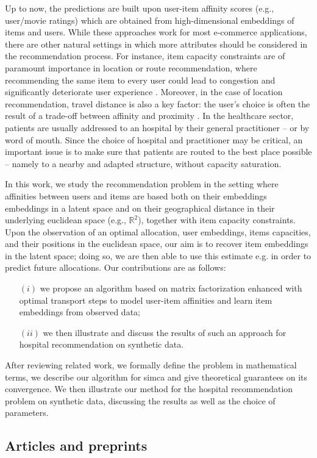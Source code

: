 Up to now, the predictions are built upon user-item affinity scores (e.g.,
user/movie ratings) which are obtained from high-dimensional embeddings of items
and users. While these approaches work for most e-commerce applications, there
are other natural settings in which more attributes should be considered in the
recommendation process. For instance, item capacity constraints are of paramount
importance in location or route recommendation, where recommending the same item
to every user could lead to congestion and significantly deteriorate  user
experience \cite{christakopoulou_recommendation_2017}. Moreover, in the case of
location recommendation, travel distance is also a key factor: the user's choice
is often the result of a trade-off between affinity and proximity
\cite{zhao_survey_2016}. In the healthcare sector, patients are usually
addressed to an hospital by their general practitioner -- or by word of mouth.
Since the choice of hospital and practitioner may be critical, an important
issue is to make sure that patients are routed to the best place possible --
namely to a nearby and adapted structure, without capacity saturation.

In this work, we study the recommendation problem in the setting where
affinities between users and items are based both on their embeddings embeddings
in a latent space and on their geographical distance in their underlying
euclidean space (e.g., $\mathbb{R}^2$), together with item capacity constraints.
Upon the observation of an optimal allocation, user embeddings, items
capacities, and their positions in the euclidean space, our aim is to recover
item embeddings in the latent space; doing so, we are then able to use this
estimate e.g. in order to predict future allocations. Our contributions are as
follows:

\begin{itemize}
    \item[$(i)$] we propose an algorithm based on matrix factorization enhanced
        with optimal transport steps to model user-item affinities and learn item
        embeddings from observed data;
    \item[$(ii)$] we then illustrate and discuss the results of such an approach
        for hospital recommendation on synthetic data.
\end{itemize}

After reviewing related work, we formally define the problem in mathematical
terms, we describe our algorithm for \ac{simca} and give theoretical guarantees
on its convergence. We then illustrate our method for the hospital
recommendation problem on synthetic data, discussing the results as well as the
choice of parameters.

\subsection{Articles and preprints}
